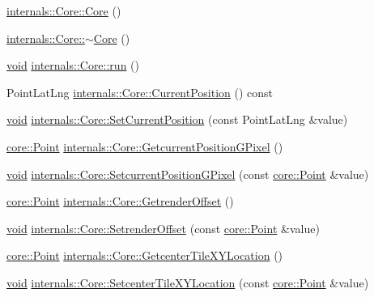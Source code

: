 \begin{DoxyCompactItemize}
\item 
\hyperlink{group___o_p_map_widget_ga7ec14a145f0d7ff3036d68814659e27d}{internals\-::\-Core\-::\-Core} ()
\item 
\hyperlink{group___o_p_map_widget_ga6ad5ec431c303aa0ea029c86fc7a5728}{internals\-::\-Core\-::$\sim$\-Core} ()
\item 
\hyperlink{group___u_a_v_objects_plugin_ga444cf2ff3f0ecbe028adce838d373f5c}{void} \hyperlink{group___o_p_map_widget_ga0d0ab90f1256808e363cd35dd5f2fa7f}{internals\-::\-Core\-::run} ()
\item 
\-Point\-Lat\-Lng \hyperlink{group___o_p_map_widget_ga44a14bf2d358ec5f93c7a99416e20732}{internals\-::\-Core\-::\-Current\-Position} () const 
\item 
\hyperlink{group___u_a_v_objects_plugin_ga444cf2ff3f0ecbe028adce838d373f5c}{void} \hyperlink{group___o_p_map_widget_ga4e5d816fef373048f1109beac294521c}{internals\-::\-Core\-::\-Set\-Current\-Position} (const \-Point\-Lat\-Lng \&value)
\item 
\hyperlink{structcore_1_1_point}{core\-::\-Point} \hyperlink{group___o_p_map_widget_ga705325edd0aba942d5a67990c7d07136}{internals\-::\-Core\-::\-Getcurrent\-Position\-G\-Pixel} ()
\item 
\hyperlink{group___u_a_v_objects_plugin_ga444cf2ff3f0ecbe028adce838d373f5c}{void} \hyperlink{group___o_p_map_widget_ga68af707707e7a27c72969b84ffcdc206}{internals\-::\-Core\-::\-Setcurrent\-Position\-G\-Pixel} (const \hyperlink{structcore_1_1_point}{core\-::\-Point} \&value)
\item 
\hyperlink{structcore_1_1_point}{core\-::\-Point} \hyperlink{group___o_p_map_widget_gae32df0621adec51500130103787bf6a0}{internals\-::\-Core\-::\-Getrender\-Offset} ()
\item 
\hyperlink{group___u_a_v_objects_plugin_ga444cf2ff3f0ecbe028adce838d373f5c}{void} \hyperlink{group___o_p_map_widget_ga78c39b61dd28bb05639737d0e72576fe}{internals\-::\-Core\-::\-Setrender\-Offset} (const \hyperlink{structcore_1_1_point}{core\-::\-Point} \&value)
\item 
\hyperlink{structcore_1_1_point}{core\-::\-Point} \hyperlink{group___o_p_map_widget_gad81fc0035925c351630e24e790d7df2d}{internals\-::\-Core\-::\-Getcenter\-Tile\-X\-Y\-Location} ()
\item 
\hyperlink{group___u_a_v_objects_plugin_ga444cf2ff3f0ecbe028adce838d373f5c}{void} \hyperlink{group___o_p_map_widget_gac19546f7c53493b741f4ffccdeb42214}{internals\-::\-Core\-::\-Setcenter\-Tile\-X\-Y\-Location} (const \hyperlink{structcore_1_1_point}{core\-::\-Point} \&value)

\end{DoxyCompactItemize}
